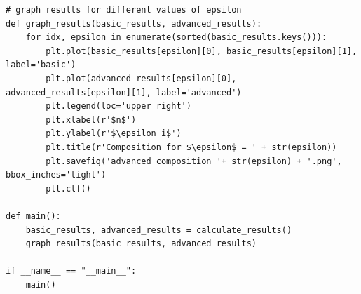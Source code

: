 \documentclass[12pt]{article}
\theoremstyle{definition}
\begin{document}
\begin{appendices}
\begin{lstlisting}
# graph results for different values of epsilon
def graph_results(basic_results, advanced_results):
    for idx, epsilon in enumerate(sorted(basic_results.keys())):
        plt.plot(basic_results[epsilon][0], basic_results[epsilon][1], label='basic')
        plt.plot(advanced_results[epsilon][0], advanced_results[epsilon][1], label='advanced')
        plt.legend(loc='upper right')
        plt.xlabel(r'$n$')
        plt.ylabel(r'$\epsilon_i$')
        plt.title(r'Composition for $\epsilon$ = ' + str(epsilon))
        plt.savefig('advanced_composition_'+ str(epsilon) + '.png', bbox_inches='tight')
        plt.clf()

def main():
    basic_results, advanced_results = calculate_results()
    graph_results(basic_results, advanced_results)

if __name__ == "__main__":
    main()
\end{lstlisting}


\end{appendices}
\end{document}
